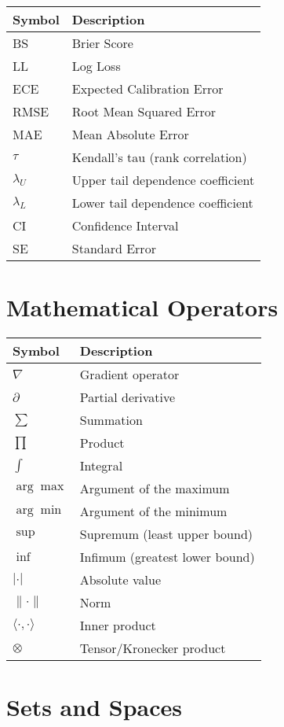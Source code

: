 \begin{tabular}{ll}
\toprule
\textbf{Symbol} & \textbf{Description} \\
\midrule
BS & Brier Score \\
LL & Log Loss \\
ECE & Expected Calibration Error \\
RMSE & Root Mean Squared Error \\
MAE & Mean Absolute Error \\
$\tau$ & Kendall's tau (rank correlation) \\
$\lambda_U$ & Upper tail dependence coefficient \\
$\lambda_L$ & Lower tail dependence coefficient \\
CI & Confidence Interval \\
SE & Standard Error \\
\bottomrule
\end{tabular}

\section*{Mathematical Operators}

\begin{tabular}{ll}
\toprule
\textbf{Symbol} & \textbf{Description} \\
\midrule
$\nabla$ & Gradient operator \\
$\partial$ & Partial derivative \\
$\sum$ & Summation \\
$\prod$ & Product \\
$\int$ & Integral \\
$\arg\max$ & Argument of the maximum \\
$\arg\min$ & Argument of the minimum \\
$\sup$ & Supremum (least upper bound) \\
$\inf$ & Infimum (greatest lower bound) \\
$|\cdot|$ & Absolute value \\
$\|\cdot\|$ & Norm \\
$\langle \cdot, \cdot \rangle$ & Inner product \\
$\otimes$ & Tensor/Kronecker product \\
\bottomrule
\end{tabular}

\section*{Sets and Spaces}

